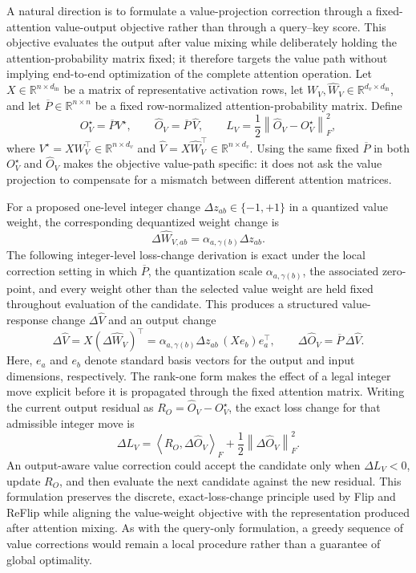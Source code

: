 \documentclass[../main.tex]{subfiles}
\begin{document}
A natural direction is to formulate a value-projection correction through a fixed-attention value-output objective rather than through a query--key score. This objective evaluates the output after value mixing while deliberately holding the attention-probability matrix fixed; it therefore targets the value path without implying end-to-end optimization of the complete attention operation. Let \(X\in\mathbb{R}^{n\times d_{\mathrm{in}}}\) be a matrix of representative activation rows, let \(W_V,\widehat W_V\in\mathbb{R}^{d_v\times d_{\mathrm{in}}}\), and let \(\overline P\in\mathbb{R}^{n\times n}\) be a fixed row-normalized attention-probability matrix. Define
\[
O_V^\star=\overline P V^\star,
\qquad
\widehat O_V=\overline P\,\widehat V,
\qquad
L_V=\frac{1}{2}\left\|\widehat O_V-O_V^\star\right\|_F^2,
\]
where \(V^\star=XW_V^\top\in\mathbb{R}^{n\times d_v}\) and \(\widehat V=X\widehat W_V^\top\in\mathbb{R}^{n\times d_v}\). Using the same fixed \(\overline P\) in both \(O_V^\star\) and \(\widehat O_V\) makes the objective value-path specific: it does not ask the value projection to compensate for a mismatch between different attention matrices.

For a proposed one-level integer change \(\Delta z_{ab}\in\{-1,+1\}\) in a quantized value weight, the corresponding dequantized weight change is
\[
\Delta \widehat W_{V,ab}
=
\alpha_{a,\gamma(b)}\Delta z_{ab}.
\]
The following integer-level loss-change derivation is exact under the local correction setting in which \(\overline P\), the quantization scale \(\alpha_{a,\gamma(b)}\), the associated zero-point, and every weight other than the selected value weight are held fixed throughout evaluation of the candidate.
This produces a structured value-response change \(\Delta\widehat V\) and an output change
\[
\Delta\widehat V
=
X\left(\Delta\widehat W_V\right)^\top
=
\alpha_{a,\gamma(b)}\Delta z_{ab}\,(Xe_b)e_a^\top,
\qquad
\Delta\widehat O_V=\overline P\,\Delta\widehat V.
\]
Here, \(e_a\) and \(e_b\) denote standard basis vectors for the output and input dimensions, respectively. The rank-one form makes the effect of a legal integer move explicit before it is propagated through the fixed attention matrix.
Writing the current output residual as \(R_O=\widehat O_V-O_V^\star\), the exact loss change for that admissible integer move is
\[
\Delta L_V
=
\left\langle R_O,\Delta\widehat O_V\right\rangle_F
+
\frac{1}{2}\left\|\Delta\widehat O_V\right\|_F^2.
\]
An output-aware value correction could accept the candidate only when \(\Delta L_V<0\), update \(R_O\), and then evaluate the next candidate against the new residual. This formulation preserves the discrete, exact-loss-change principle used by Flip and ReFlip while aligning the value-weight objective with the representation produced after attention mixing. As with the query-only formulation, a greedy sequence of value corrections would remain a local procedure rather than a guarantee of global optimality.
\end{document}
